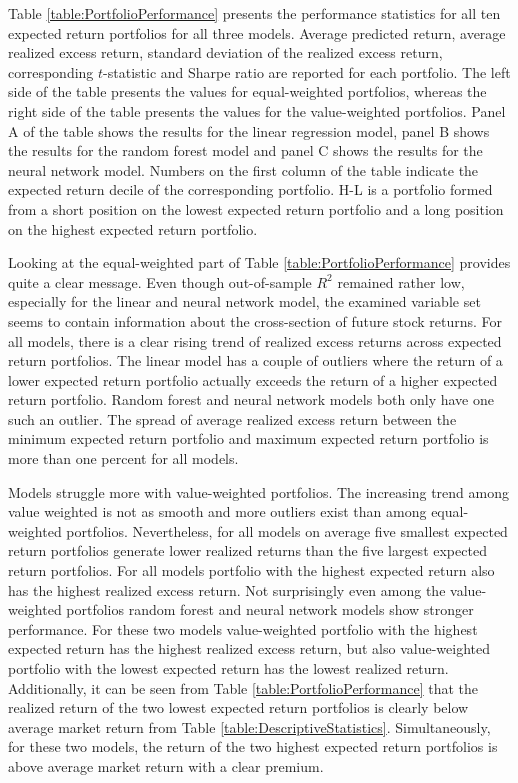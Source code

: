 \documentclass[12pt]{article}
\begin{document}
Table \ref{table:PortfolioPerformance} presents the performance statistics for all ten expected return portfolios for all three models. Average predicted return, average realized excess return, standard deviation of the realized excess return, corresponding $t$-statistic and Sharpe ratio are reported for each portfolio. The left side of the table presents the values for equal-weighted portfolios, whereas the right side of the table presents the values for the value-weighted portfolios. Panel A of the table shows the results for the linear regression model, panel B shows the results for the random forest model and panel C shows the results for the neural network model. Numbers on the first column of the table indicate the expected return decile of the corresponding portfolio. H-L is a portfolio formed from a short position on the lowest expected return portfolio and a long position on the highest expected return portfolio. \par

Looking at the equal-weighted part of Table \ref{table:PortfolioPerformance} provides quite a clear message. Even though out-of-sample $R^2$ remained rather low, especially for the linear and neural network model, the examined variable set seems to contain information about the cross-section of future stock returns. For all models, there is a clear rising trend of realized excess returns across expected return portfolios. The linear model has a couple of outliers where the return of a lower expected return portfolio actually exceeds the return of a higher expected return portfolio. Random forest and neural network models both only have one such an outlier. The spread of average realized excess return between the minimum expected return portfolio and maximum expected return portfolio is more than one percent for all models.  \par

Models struggle more with value-weighted portfolios. The increasing trend among value weighted is not as smooth and more outliers exist than among equal-weighted portfolios. Nevertheless, for all models on average five smallest expected return portfolios generate lower realized returns than the five largest expected return portfolios. For all models portfolio with the highest expected return also has the highest realized excess return. Not surprisingly even among the value-weighted portfolios random forest and neural network models show stronger performance. For these two models value-weighted portfolio with the highest expected return has the highest realized excess return, but also value-weighted portfolio with the lowest expected return has the lowest realized return. Additionally, it can be seen from Table \ref{table:PortfolioPerformance} that the realized return of the two lowest expected return portfolios is clearly below average market return from Table \ref{table:DescriptiveStatistics}. Simultaneously, for these two models, the return of the two highest expected return portfolios is above average market return with a clear premium. \par
\end{document}
